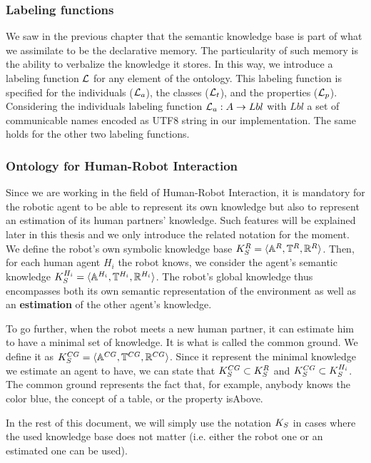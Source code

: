 \subsubsection{Labeling functions}

We saw in the previous chapter that the semantic knowledge base is part of what we assimilate to be the declarative memory. The particularity of such memory is the ability to verbalize the knowledge it stores. In this way, we introduce a labeling function $\mathcal{L}$ for any element of the ontology. This labeling function is specified for the individuals ($\mathcal{L}_a$), the classes ($\mathcal{L}_t$), and the properties ($\mathcal{L}_p$). Considering the individuals labeling function $\mathcal{L}_a: A \rightarrow Lbl$ with $Lbl$ a set of communicable names encoded as UTF8 string in our implementation. The same holds for the other two labeling functions.

\subsubsection{Ontology for Human-Robot Interaction}

Since we are working in the field of Human-Robot Interaction, it is mandatory for the robotic agent to be able to represent its own knowledge but also to represent an estimation of its human partners' knowledge. Such features will be explained later in this thesis and we only introduce the related notation for the moment.
We define the robot's own symbolic knowledge base $K_S^R = \langle \mathbb{A}^R, \mathbb{T}^R, \mathbb{R}^R\rangle$.
Then, for each human agent $H_i$ the robot knows, we consider the agent's semantic knowledge $K_S^{H_i} = \langle \mathbb{A}^{H_i}, \mathbb{T}^{H_i}, \mathbb{R}^{H_i} \rangle$.
The robot's global knowledge thus encompasses both its own semantic representation of the environment as well as an \textbf{estimation} of the other agent's knowledge.

To go further, when the robot meets a new human partner, it can estimate him to have a minimal set of knowledge. It is what is called the common ground. We define it as $K_S^{CG} = \langle \mathbb{A}^{CG}, \mathbb{T}^{CG}, \mathbb{R}^{CG}\rangle$. Since it represent the minimal knowledge we estimate an agent to have, we can state that $K_S^{CG} \subset K_S^R$ and $K_S^{CG} \subset K_S^{H_i}$. The common ground represents the fact that, for example, anybody knows the color blue, the concept of a table, or the property isAbove.

In the rest of this document, we will simply use the notation $K_S$ in cases where the used knowledge base does not matter (i.e. either the robot one or an estimated one can be used).

